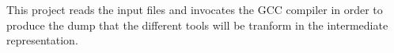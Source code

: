 This project reads the input files and invocates the G\+CC compiler in order to produce the dump that the different tools will be tranform in the intermediate representation. 